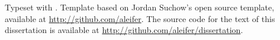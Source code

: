 \begin{comment}
Some nematode strains used in this work were provided by the Caenorhabditis Genetics Center, which is funded by the NIH National Center for Research Resources (NCRR).

\end{comment}
Typeset with \XeTeX. Template based on Jordan Suchow's open source template, available at \href{https://github.com/aleifer/LaTeX-template-for-Harvard-dissertation}{http://github.com/aleifer}.
The source code for the text of this dissertation is available at \url{http://github.com/aleifer/dissertation}.
